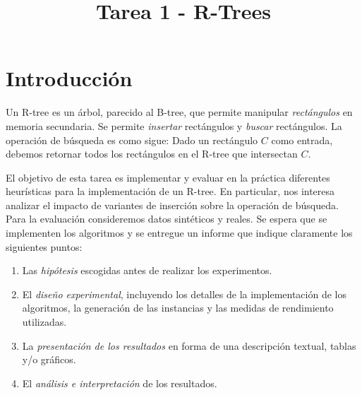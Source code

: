 \documentclass[dcc,uchile]{fcfmcourse}
\title{Tarea 1 - R-Trees}
\begin{document}
\captionsetup[table]{name=Tabla}
\captionsetup[table]{name=Figura}

\maketitle
\vspace{-1ex}
\section{Introducción}
Un R-tree es un árbol, parecido al B-tree, que permite manipular \textit{rectángulos} en memoria secundaria. Se permite \textit{insertar} rectángulos y \textit{buscar} rectángulos. La operación de búsqueda es como sigue: Dado un rectángulo $C$ como entrada, debemos retornar todos los rectángulos en el R-tree que intersectan $C$.

El objetivo de esta tarea es implementar y evaluar en la práctica diferentes heurísticas para la implementación de un R-tree. En particular, nos interesa analizar el impacto de variantes de inserción sobre la operación de búsqueda. Para la evaluación consideremos datos sintéticos y reales. Se espera que se implementen los algoritmos y se entregue un informe que indique claramente los siguientes puntos:

\begin{enumerate}[1.]
    \item Las \textit{hipótesis} escogidas antes de realizar los experimentos.
    \item El \textit{diseño experimental}, incluyendo los detalles de la implementación de los algoritmos, la generación de las instancias y las medidas de rendimiento utilizadas.
    \item La \textit{presentación de los resultados} en forma de una descripción textual, tablas y/o gráficos.
    \item El \textit{análisis e interpretación} de los resultados.
\end{enumerate}
\end{document}
